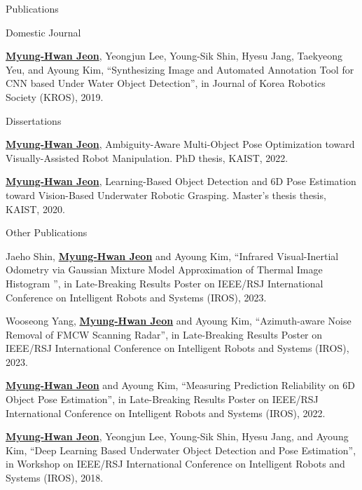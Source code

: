 \begin{rSection}{Publications}
\begin{pubSubsection}{Domestic Journal}
  \item\underline{\textbf{Myung-Hwan Jeon}}, Yeongjun Lee, Young-Sik Shin, Hyesu Jang, Taekyeong Yeu, and Ayoung Kim, “Synthesizing Image and Automated Annotation Tool for CNN based Under Water Object Detection”, in Journal of Korea Robotics Society (KROS), 2019.
  
\end{pubSubsection}

\begin{pubSubsection}{Dissertations}
  \item \underline{\textbf{Myung-Hwan Jeon}}, Ambiguity-Aware Multi-Object Pose Optimization toward Visually-Assisted Robot Manipulation. PhD thesis, \acf{KAIST}, 2022.
  
  \item \underline{\textbf{Myung-Hwan Jeon}}, Learning-Based Object Detection and 6D Pose Estimation toward Vision-Based Underwater Robotic Grasping. Master's thesis thesis, \acf{KAIST}, 2020.
  
\end{pubSubsection}

\begin{pubSubsection}{Other Publications}

  \item Jaeho Shin, \underline{\textbf{Myung-Hwan Jeon}} and Ayoung Kim, “Infrared Visual-Inertial Odometry via Gaussian Mixture Model Approximation of Thermal Image Histogram ”, in Late-Breaking Results Poster on IEEE/RSJ International Conference on Intelligent Robots and Systems (IROS), 2023.  
  
  \item Wooseong Yang, \underline{\textbf{Myung-Hwan Jeon}} and Ayoung Kim, “Azimuth-aware Noise Removal of FMCW Scanning Radar”, in Late-Breaking Results Poster on IEEE/RSJ International Conference on Intelligent Robots and Systems (IROS), 2023.  

  \item \underline{\textbf{Myung-Hwan Jeon}} and Ayoung Kim, “Measuring Prediction Reliability on 6D Object Pose Estimation”, in Late-Breaking Results Poster on IEEE/RSJ International Conference on Intelligent Robots and Systems (IROS), 2022.  

  \item \underline{\textbf{Myung-Hwan Jeon}}, Yeongjun Lee, Young-Sik Shin, Hyesu Jang, and Ayoung Kim, “Deep Learning Based Underwater Object Detection and Pose Estimation”, in Workshop on IEEE/RSJ International Conference on Intelligent Robots and Systems (IROS), 2018.

\end{pubSubsection} 





\end{rSection}

